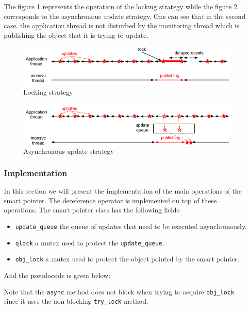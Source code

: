 The figure \ref{fig:sync_ptr} represents the operation of the locking strategy while the figure \ref{fig:async_ptr} corresponds to the asynchronous update strategy. One can see that in the second case, the application thread is not disturbed by the monitoring thread which is publishing the object that it is trying to update.
\begin{figure}[ht!]
\centering
\includegraphics[scale=0.6]{Images/async_before.png}
\caption{Locking strategy}
\label{fig:sync_ptr}
\end{figure}

\begin{figure}[ht!]
\centering
\includegraphics[scale=0.6]{Images/async_after.png}
\caption{Asynchronous update strategy}
\label{fig:async_ptr}
\end{figure}

\subsubsection*{Implementation}

In this section we will present the implementation of the main operations of the smart pointer. The dereference operator is implemented on top of these operations. The smart pointer class has the following fields:
\begin{itemize}
\item {\tt update\_queue} the queue of updates that need to be executed asynchronously.
\item {\tt qlock} a mutex used to protect the {\tt update\_queue}.
\item {\tt obj\_lock} a mutex used to protect the object pointed by the smart pointer.
\end{itemize}
And the pseudocode is given below:

Note that the {\tt async} method does not block when trying to acquire {\tt obj\_lock} since it uses the non-blocking {\tt try\_lock} method. 

